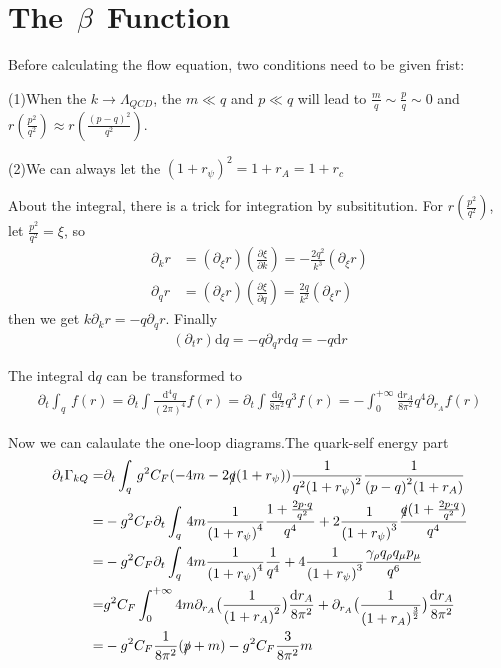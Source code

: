 \documentclass[UTF8]{ctexart}
\begin{document}
\section{The\,\,\,$\beta$\,\,\,Function}
Before calculating the flow equation, two conditions need to be given frist:
\par(1)When the $k\to\Lambda_{QCD}$, the $m\ll q$ and $p\ll q$ will lead to $\frac{m}{q}\sim\frac{p}{q}\sim0$ and $r(\frac{{p}^2}{q^2})\approx r(\frac{{(p-q)}^2}{q^2})$.
\par(2)We can always let the ${(1+r_{\psi})}^2=1+r_{A}=1+r_{c}$
\par About the integral, there is a trick for integration by subsititution. For $r(\frac{p^2}{q^2})$, let $\frac{p^2}{q^2}=\xi$, so
\begin{align}
\partial_{k}r&=(\partial_{\xi}r)(\frac{\partial\xi}{\partial k})=-\frac{2q^2}{k^3}(\partial_{\xi}r)
\\\partial_{q}r&=(\partial_{\xi}r)(\frac{\partial\xi}{\partial q})=\frac{2q}{k^2}(\partial_{\xi}r)
\end{align}
then we get $k\partial_{k}r=-q\partial_{q}r$. Finally
\begin{align}
(\partial_{t}r)\mathrm{d}q=-q\partial_{q}r\mathrm{d}q=-q\mathrm{d}r
\end{align}
\par The integral $\mathrm{d}q$ can be transformed to 
\begin{align}
\partial_{t}\int_{q}\,f(r)=\partial_{t}\int\frac{{\mathrm{d}}^4 q}{{(2\pi)}^4}f(r)=\partial_{t}\int\frac{\mathrm{d}q}{8{\pi}^2}q^{3}f(r)=-\int_{0}^{+\infty}\frac{\mathrm{d}r_{A}}{8{\pi}^2}q^{4}\partial_{r_A}f(r)
\end{align}
\par Now we can calaulate the one-loop diagrams.The quark-self energy part
\begin{align}
\partial_{t}\Gamma_{kQ}=
&\partial_{t}\int_{q}\,g^{2}C_F(-4m-2\slashed{q}(1+r_{\psi}))\frac{1}{q^{2}{(1+r_{\psi})}^2}\frac{1}{{(p-q)}^{2}(1+r_{A})}
\notag\\=&-g^{2}C_F\partial_{t}\int_{q}\,4m\frac{1}{{(1+r_{\psi})}^4}\frac{1+\frac{2p\cdot q}{q^2}}{q^4}+2\frac{1}{{(1+r_{\psi})}^3}\frac{\slashed{q}(1+\frac{2p\cdot q}{q^2})}{q^4}
\notag\\=&-g^{2}C_F\partial_{t}\int_{q}\,4m\frac{1}{{(1+r_{\psi})}^4}\frac{1}{q^4}+4\frac{1}{{(1+r_{\psi})}^3}\frac{\gamma_{\rho}q_{\rho}q_{\mu}p_{\mu}}{q^6}
\notag\\=&g^{2}C_F\int_{0}^{+\infty}4m\partial_{r_{A}}\big(\frac{1}{{(1+r_{A})}^2}\big)\frac{\mathrm{d}r_{A}}{8{\pi}^2}+\partial_{r_{A}}\big(\frac{1}{{(1+r_{A})}^{\frac{3}{2}}}\big)\frac{\mathrm{d}r_{A}}{8{\pi}^2}
\notag\\=&-g^{2}C_F\frac{1}{8{\pi}^2}(\slashed{p}+m)-g^{2}C_{F}\frac{3}{8{\pi}^2}m
\end{align}
\end{document}
